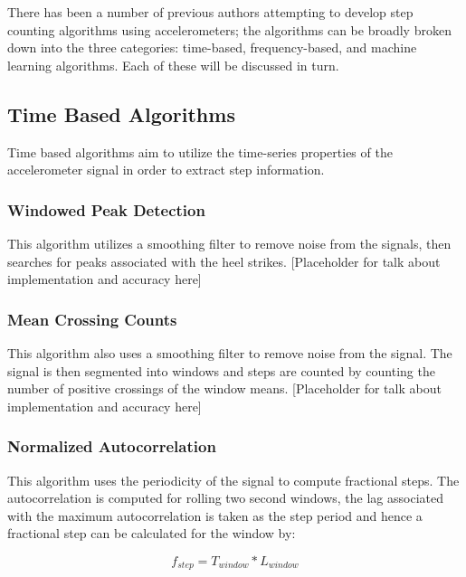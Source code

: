             There has been a number of previous authors attempting to develop step counting algorithms using accelerometers; the algorithms can be broadly broken down into the three categories: time-based, frequency-based, and machine learning algorithms. Each of these will be discussed in turn.

            \subsection{Time Based Algorithms}

                Time based algorithms aim to utilize the time-series properties of the accelerometer signal in order to extract step information.

                \subsubsection{Windowed Peak Detection}

                    This algorithm utilizes a smoothing filter to remove noise from the signals, then searches for peaks associated with the heel strikes. [Placeholder for talk about implementation and accuracy here]

                \subsubsection{Mean Crossing Counts}

                    This algorithm also uses a smoothing filter to remove noise from the signal. The signal is then segmented into windows and steps are counted by counting the number of positive crossings of the window means. [Placeholder for talk about implementation and accuracy here]

                \subsubsection{Normalized Autocorrelation}

                    This algorithm uses the periodicity of the signal to compute fractional steps. The autocorrelation is computed for rolling two second windows, the lag associated with the maximum autocorrelation is taken as the step period and hence a fractional step can be calculated for the window by:

                    \begin{equation}
                        f_{step} = T_{window} * L_{window}
                    \end{equation}

